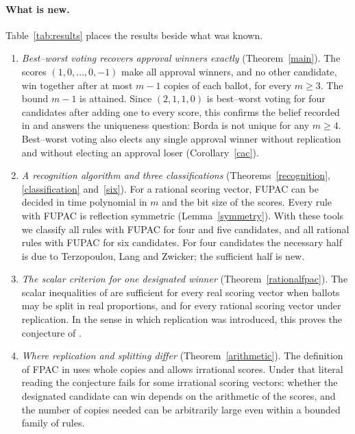 \documentclass[11pt,a4paper]{article}
\theoremstyle{definition}
\theoremstyle{remark}
\begin{document}
\paragraph{What is new.} Table~\ref{tab:results} places the results beside what was known.
\begin{enumerate}[nosep,leftmargin=*]
\item \emph{Best--worst voting recovers approval winners exactly} (Theorem~\ref{main}). The scores $(1,0,\ldots,0,-1)$ make all approval winners, and no other candidate, win together after at most $m-1$ copies of each ballot, for every $m\ge3$. The bound $m-1$ is attained. Since $(2,1,1,0)$ is best--worst voting for four candidates after adding one to every score, this confirms the belief recorded in \cite[note~11]{tlz} and answers the uniqueness question: Borda is not unique for any $m\ge4$. Best--worst voting also elects any single approval winner without replication and without electing an approval loser (Corollary~\ref{cac}).
\item \emph{A recognition algorithm and three classifications} (Theorems~\ref{recognition}, \ref{classification} and~\ref{six}). For a rational scoring vector, FUPAC can be decided in time polynomial in $m$ and the bit size of the scores. Every rule with FUPAC is reflection symmetric (Lemma~\ref{symmetry}). With these tools we classify all rules with FUPAC for four and five candidates, and all rational rules with FUPAC for six candidates. For four candidates the necessary half is due to Terzopoulou, Lang and Zwicker; the sufficient half is new.
\item \emph{The scalar criterion for one designated winner} (Theorem~\ref{rationalfpac}). The scalar inequalities of \cite[Lemma~2]{tlz} are sufficient for every real scoring vector when ballots may be split in real proportions, and for every rational scoring vector under replication. In the sense in which replication was introduced, this proves the conjecture of \cite[note~9]{tlz}.
\item \emph{Where replication and splitting differ} (Theorem~\ref{arithmetic}). The definition of FPAC in \cite[Definition~2]{tlz} uses whole copies and allows irrational scores. Under that literal reading the conjecture fails for some irrational scoring vectors: whether the designated candidate can win depends on the arithmetic of the scores, and the number of copies needed can be arbitrarily large even within a bounded family of rules.
\end{enumerate}
\end{document}
